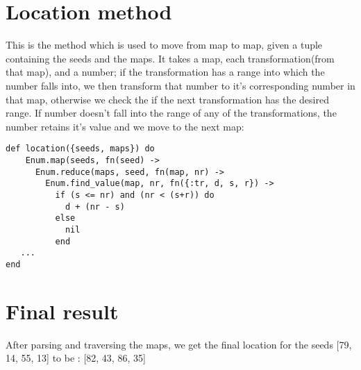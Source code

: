 \documentclass[a4paper,11pt]{article}
\begin{document}
\section*{Location method}
This is the method which is used to move from map to map, given a tuple containing the seeds and the maps. It takes a map, each transformation(from that map), and a number; if the transformation has a range into which the number falls into, we then transform that number to it's corresponding number in that map, otherwise we check the if the next transformation has the desired range. If number doesn't fall into the range of any of the transformations, the number retains it's value and we move to the next map:
\begin{verbatim}
def location({seeds, maps}) do
    Enum.map(seeds, fn(seed) ->
      Enum.reduce(maps, seed, fn(map, nr) ->
        Enum.find_value(map, nr, fn({:tr, d, s, r}) ->
          if (s <= nr) and (nr < (s+r)) do
            d + (nr - s)
          else
            nil
          end
   ...
end
\end{verbatim}

\section*{Final result}
After parsing and traversing the maps, we get the final location for the seeds {[79, 14, 55, 13]} to be : {[82, 43, 86, 35]}
\end{document}
